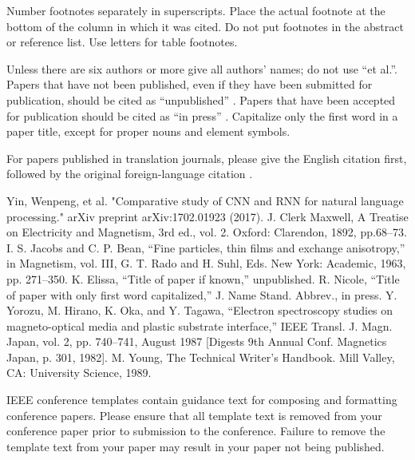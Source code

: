 \documentclass[conference]{IEEEtran}
\begin{document}
Number footnotes separately in superscripts. Place the actual footnote at 
the bottom of the column in which it was cited. Do not put footnotes in the 
abstract or reference list. Use letters for table footnotes.

Unless there are six authors or more give all authors' names; do not use 
``et al.''. Papers that have not been published, even if they have been 
submitted for publication, should be cited as ``unpublished'' \cite{b4}. Papers 
that have been accepted for publication should be cited as ``in press'' \cite{b5}. 
Capitalize only the first word in a paper title, except for proper nouns and 
element symbols.

For papers published in translation journals, please give the English 
citation first, followed by the original foreign-language citation \cite{b6}.

\begin{thebibliography}{00}
 Yin, Wenpeng, et al. "Comparative study of CNN and RNN for natural language processing." arXiv preprint arXiv:1702.01923 (2017).
 J. Clerk Maxwell, A Treatise on Electricity and Magnetism, 3rd ed., vol. 2. Oxford: Clarendon, 1892, pp.68--73.
 I. S. Jacobs and C. P. Bean, ``Fine particles, thin films and exchange anisotropy,'' in Magnetism, vol. III, G. T. Rado and H. Suhl, Eds. New York: Academic, 1963, pp. 271--350.
 K. Elissa, ``Title of paper if known,'' unpublished.
 R. Nicole, ``Title of paper with only first word capitalized,'' J. Name Stand. Abbrev., in press.
 Y. Yorozu, M. Hirano, K. Oka, and Y. Tagawa, ``Electron spectroscopy studies on magneto-optical media and plastic substrate interface,'' IEEE Transl. J. Magn. Japan, vol. 2, pp. 740--741, August 1987 [Digests 9th Annual Conf. Magnetics Japan, p. 301, 1982].
 M. Young, The Technical Writer's Handbook. Mill Valley, CA: University Science, 1989.
\end{thebibliography}
\vspace{12pt}
\color{red}
IEEE conference templates contain guidance text for composing and formatting conference papers. Please ensure that all template text is removed from your conference paper prior to submission to the conference. Failure to remove the template text from your paper may result in your paper not being published.
\end{document}
